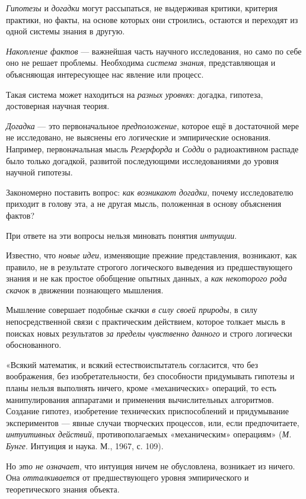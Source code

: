 \documentclass[a4paper,14pt,russian]{extreport}
\begin{document}
\emph{Гипотезы} и \emph{догадки} могут рассыпаться, не выдерживая критики, критерия практики, но факты, на основе которых они строились, остаются и переходят из одной системы знания в другую.

\emph{Накопление фактов} --- важнейшая часть научного исследования, но само по себе оно не решает проблемы. Необходима \emph{система знания}, представляющая и объясняющая интересующее нас явление или процесс.

Такая система может находиться на \emph{разных уровнях}: догадка, гипотеза, достоверная научная теория.

\emph{Догадка} --- это первоначальное \emph{предположение}, которое ещё в достаточной мере не исследовано, не выяснены его логические и эмпирические основания. Например, первоначальная мысль \emph{Резерфорда} и \emph{Содди} о радиоактивном распаде было только догадкой, развитой последующими исследованиями до уровня научной гипотезы.

Закономерно поставить вопрос: \emph{как возникают догадки}, почему исследователю приходит в голову эта, а не другая мысль, положенная в основу объяснения фактов?

При ответе на эти вопросы нельзя миновать понятия \emph{интуиции}.

Известно, что \emph{новые идеи}, изменяющие прежние представления, возникают, как правило, не в результате строгого логического выведения из предшествующего знания и не как простое обобщение опытных данных, а \emph{как некоторого рода скачок} в движении познающего мышления.

Мышление совершает подобные скачки \emph{в силу своей природы}, в силу непосредственной связи с практическим действием, которое толкает мысль в поисках новых результатов \emph{за пределы чувственно данного} и строго логически обоснованного.

«Всякий математик, и всякий естествоиспытатель согласится, что без воображения, без изобретательности, без способности придумывать гипотезы и планы нельзя выполнять ничего, кроме «механических» операций, то есть манипулирования аппаратами и применения вычислительных алгоритмов. Создание гипотез, изобретение технических приспособлений и придумывание экспериментов --- явные случаи творческих процессов, или, если предпочитаете, \emph{интуитивных действий}, противополагаемых «механическим» операциям» (\emph{М. Бунге}. Интуиция и наука. М., 1967, с. 109).

Но \emph{это не означает}, что интуиция ничем не обусловлена, возникает из ничего. Она \emph{отталкивается} от предшествующего уровня эмпирического и теоретического знания объекта.
\end{document}
